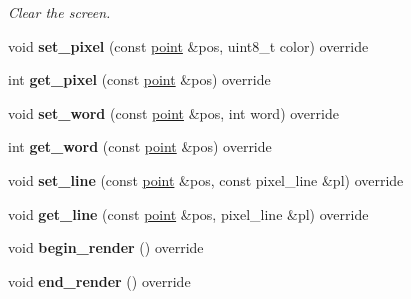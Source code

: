 \begin{DoxyCompactItemize}
\begin{DoxyCompactList}\small\item\em Clear the screen. \end{DoxyCompactList}\item 
\mbox{\label{classeka2l1_1_1driver_1_1screen__driver__ogl_a543b6b749f7d34c3af1b3914b249c21f}} 
void {\bfseries set\+\_\+pixel} (const \mbox{\hyperlink{structeka2l1_1_1vec2}{point}} \&pos, uint8\+\_\+t color) override
\item 
\mbox{\label{classeka2l1_1_1driver_1_1screen__driver__ogl_ad3891957287aa4b521b3889bdb176181}} 
int {\bfseries get\+\_\+pixel} (const \mbox{\hyperlink{structeka2l1_1_1vec2}{point}} \&pos) override
\item 
\mbox{\label{classeka2l1_1_1driver_1_1screen__driver__ogl_a7855d854bede1c629d93143d2bf00047}} 
void {\bfseries set\+\_\+word} (const \mbox{\hyperlink{structeka2l1_1_1vec2}{point}} \&pos, int word) override
\item 
\mbox{\label{classeka2l1_1_1driver_1_1screen__driver__ogl_ac75fb6a1ffc175333bfd77243b895666}} 
int {\bfseries get\+\_\+word} (const \mbox{\hyperlink{structeka2l1_1_1vec2}{point}} \&pos) override
\item 
\mbox{\label{classeka2l1_1_1driver_1_1screen__driver__ogl_a2ac0b8719a2d67e46713999c1fdbe7b1}} 
void {\bfseries set\+\_\+line} (const \mbox{\hyperlink{structeka2l1_1_1vec2}{point}} \&pos, const pixel\+\_\+line \&pl) override
\item 
\mbox{\label{classeka2l1_1_1driver_1_1screen__driver__ogl_a61f0d6219ef909bb695b4f5f793ffe1b}} 
void {\bfseries get\+\_\+line} (const \mbox{\hyperlink{structeka2l1_1_1vec2}{point}} \&pos, pixel\+\_\+line \&pl) override
\item 
\mbox{\label{classeka2l1_1_1driver_1_1screen__driver__ogl_ab0e9ae8e39717fde7655c4793e65245a}} 
void {\bfseries begin\+\_\+render} () override
\item 
\mbox{\label{classeka2l1_1_1driver_1_1screen__driver__ogl_aaa9f21889a74f241016fbc0352954d8f}} 
void {\bfseries end\+\_\+render} () override
\end{DoxyCompactItemize}
